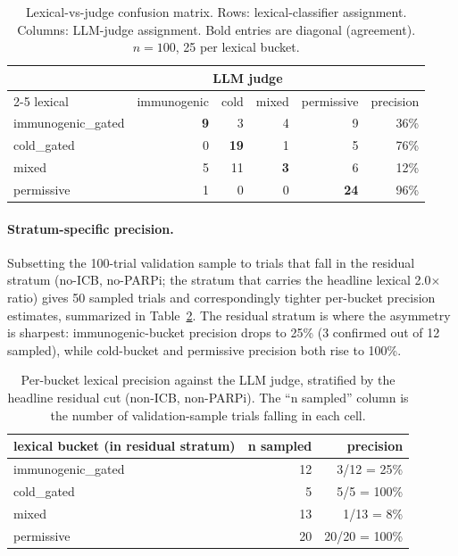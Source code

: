 \documentclass{article}
\begin{document}
\begin{table}[ht]
  \caption{Lexical-vs-judge confusion matrix.  Rows: lexical-classifier
    assignment.  Columns: LLM-judge assignment.  Bold entries are
    diagonal (agreement).  $n=100$, 25 per lexical bucket.}
  \label{tab:a6_confusion}
  \centering
  \small
  \begin{tabular}{lrrrrr}
    \toprule
     & \multicolumn{4}{c}{LLM judge} \\
    \cmidrule(r){2-5}
    lexical & immunogenic & cold & mixed & permissive & precision \\
    \midrule
    immunogenic\_gated & \textbf{9} &  3 &  4 &  9 & 36\% \\
    cold\_gated        &  0 & \textbf{19} &  1 &  5 & 76\% \\
    mixed              &  5 & 11 & \textbf{3} &  6 & 12\% \\
    permissive         &  1 &  0 &  0 & \textbf{24} & 96\% \\
    \bottomrule
  \end{tabular}
\end{table}

\paragraph{Stratum-specific precision.}
Subsetting the 100-trial validation sample to trials that fall in
the residual stratum (no-ICB, no-PARPi; the stratum that carries the
headline lexical 2.0$\times$ ratio) gives 50 sampled trials and
correspondingly tighter per-bucket precision estimates, summarized
in Table~\ref{tab:a6_residual}.  The residual stratum is where the
asymmetry is sharpest: immunogenic-bucket precision drops to 25\%
(3 confirmed out of 12 sampled), while cold-bucket and permissive
precision both rise to 100\%.

\begin{table}[ht]
  \caption{Per-bucket lexical precision against the LLM judge,
    stratified by the headline residual cut (non-ICB, non-PARPi).
    The ``n sampled'' column is the number of validation-sample
    trials falling in each cell.}
  \label{tab:a6_residual}
  \centering
  \small
  \begin{tabular}{lrr}
    \toprule
    lexical bucket (in residual stratum) & n sampled & precision \\
    \midrule
    immunogenic\_gated & 12 & 3/12 = \phantom{0}25\% \\
    cold\_gated        &  5 & 5/5  = 100\% \\
    mixed              & 13 & 1/13 = \phantom{00}8\% \\
    permissive         & 20 & 20/20 = 100\% \\
    \bottomrule
  \end{tabular}
\end{table}
\end{document}
